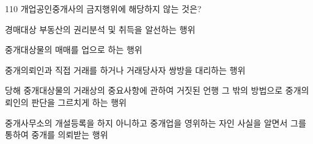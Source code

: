 \begin{question}{110}
개업공인중개사의 금지행위에 해당하지 않는 것은?
\begin{choices}
  \item 경매대상 부동산의 권리분석 및 취득을 알선하는 행위
  \item 중개대상물의 매매를 업으로 하는 행위
  \item 중개의뢰인과 직접 거래를 하거나 거래당사자 쌍방을 대리하는 행위
  \item 당해 중개대상물의 거래상의 중요사항에 관하여 거짓된 언행 그 밖의 방법으로 중개의뢰인의 판단을 그르치게 하는 행위
  \item 중개사무소의 개설등록을 하지 아니하고 중개업을 영위하는 자인 사실을 알면서 그를 통하여 중개를 의뢰받는 행위
\end{choices}
\end{question}

